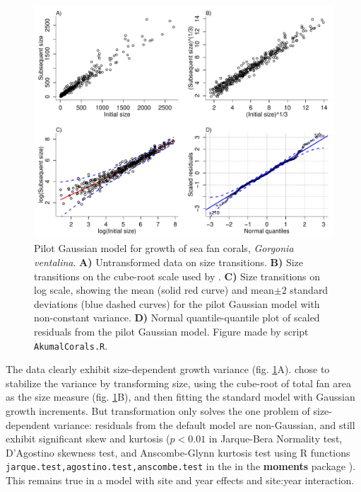 \documentclass[11pt]{article}
\begin{document}
{\begin{figure}[tbp]
\centering
\includegraphics[width=\textwidth]{figures/AkumalPilot.pdf}
\caption{Pilot Gaussian model for growth of sea fan corals, \emph{Gorgonia ventalina}. \textbf{A)} Untransformed
data on size transitions. \textbf{B)} Size transitions on the cube-root scale used by \citet{bruno-etal-2011}. 
\textbf{C)} Size transitions on log scale, showing the mean (solid red curve) and mean$\pm 2$ standard deviations (blue dashed
curves) for the pilot Gaussian model with non-constant variance. \textbf{D)} Normal quantile-quantile plot of scaled residuals
from the pilot Gaussian model. Figure made by script \texttt{AkumalCorals.R}.}
\label{fig:AkumalPilot}
\end{figure} 

The data clearly exhibit size-dependent growth variance (fig. \ref{fig:AkumalPilot}A). 
\citet{bruno-etal-2011} chose to stabilize the variance by transforming size,
using the cube-root of total fan area as the size measure (fig. \ref{fig:AkumalPilot}B), and then fitting the standard 
model with Gaussian growth increments. But transformation only solves the one problem of size-dependent variance: residuals from 
the default model are non-Gaussian, and still exhibit significant skew and kurtosis ($p<0.01$ in Jarque-Bera Normality test, D'Agostino skewness test, 
and Anscombe-Glynn kurtosis test using R functions \texttt{jarque.test,agostino.test,anscombe.test} in the 
in the \textbf{moments} package \citep{komsta-2015}). This remains true in a model with site and year effects and 
site:year interaction. 

}
\end{document}
